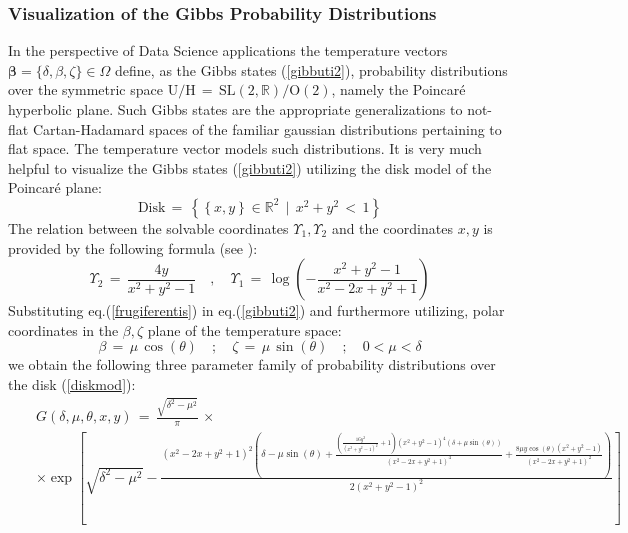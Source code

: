 \documentclass[10pt,a4paper]{article}
\begin{document}
\subsubsection{Visualization of the Gibbs Probability Distributions}
In the perspective of Data Science applications the temperature vectors $\boldsymbol{\beta}=\{\delta,\beta,\zeta\}\in \Omega$ define, as the Gibbs states (\ref{gibbuti2}), probability distributions over the symmetric space $\mathrm{U/H} \, = \, \mathrm{SL(2,\mathbb{R})/O(2)}$, namely the Poincar\'e hyperbolic plane. Such Gibbs states are the appropriate generalizations to not-flat Cartan-Hadamard spaces of the
familiar gaussian distributions pertaining to flat space. The temperature vector models such distributions. It is very much helpful to visualize the Gibbs states (\ref{gibbuti2}) utilizing the disk model of the Poincar\'e plane:
\begin{equation}\label{diskmod}
  \text{Disk} \, = \, \left\{ \left\{x,y\right\} \in \mathbb{R}^2\, \mid \, x^2+y^2 \, < \, 1\right\}
\end{equation}
The relation between the solvable coordinates $\Upsilon_1,\Upsilon_2$ and the coordinates $x,y$ is provided by the following formula (see \cite{pgtstheory,tassellandum}):
\begin{equation}\label{frugiferentis}
  \Upsilon _2\, = \,  \frac{4 y}{x^2+y^2-1}\quad , \quad \Upsilon _1\, = \,  \log
   \left(-\frac{x^2+y^2-1}{x^2-2 x+y^2+1}\right)
\end{equation}
Substituting eq.(\ref{frugiferentis}) in eq.(\ref{gibbuti2}) and furthermore utilizing, polar coordinates in the
$\beta,\zeta$ plane of the temperature space:
\begin{equation}\label{fintereo}
  \beta \, = \, \mu \, \cos(\theta) \quad ; \quad  \zeta \, = \, \mu \, \sin(\theta)\quad ; \quad 0 < \mu < \delta
\end{equation}
we obtain the following three parameter family of probability distributions over the disk (\ref{diskmod}):
\begin{eqnarray}
\label{perigord}
 &&G(\delta,\mu,\theta,x,y) \,=\, \frac{\sqrt{\delta ^2-\mu ^2} }{\pi } \, \times \nonumber\\
   && \times \exp \left[\sqrt{\delta ^2-\mu ^2}-\frac{\left(x^2-2
   x+y^2+1\right)^2 \left(\delta -\mu  \sin (\theta )+\frac{\left(\frac{16
   y^2}{\left(x^2+y^2-1\right)^2}+1\right) \left(x^2+y^2-1\right)^4 (\delta +\mu  \sin
   (\theta ))}{\left(x^2-2 x+y^2+1\right)^4}+\frac{8 \mu  y \cos (\theta )
   \left(x^2+y^2-1\right)}{\left(x^2-2 x+y^2+1\right)^2}\right)}{2
   \left(x^2+y^2-1\right)^2}\right] \nonumber\\
\end{eqnarray}
\end{document}
